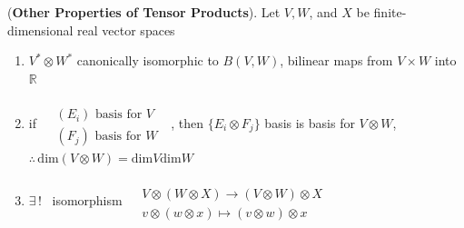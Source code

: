 \begin{proposition}[11.4] (\textbf{Other Properties of Tensor Products}).  Let $V, W$, and $X$ be finite-dimensional real vector spaces 
\begin{enumerate}
  \item[(a)] $V^* \otimes W^*$ canonically isomorphic to $B(V,W)$, bilinear maps from $V\times W$ into $\mathbb{R}$
  \item[(b)] if $\begin{aligned} & \quad \\ & (E_i) \text{ basis for $V$ } \\ & (F_j) \text{ basis for $W$ } \end{aligned}$, then $\lbrace E_i \otimes F_j \rbrace$ basis is basis for $V\otimes W$, $\therefore \, \text{dim}{(V\otimes W)} = \text{dim}{V} \text{dim}{W}$
  \item[(c)] $\exists \, !$ \, isomorphism $\begin{aligned} & \quad \\ & V\otimes (W\otimes X) \to (V \otimes W) \otimes X \\ & v\otimes (w \otimes x) \mapsto (v\otimes w)\otimes x \end{aligned}$
\end{enumerate}
\end{proposition}



